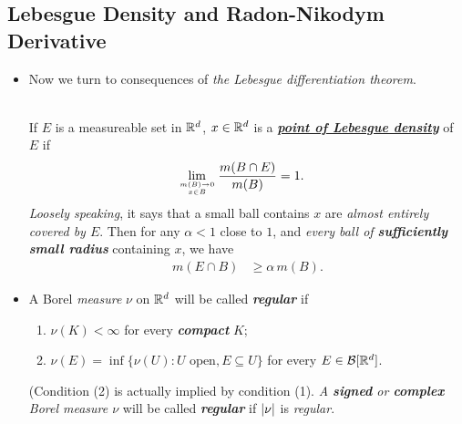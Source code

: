 \documentclass[11pt]{article}
\begin{document}
\subsection{Lebesgue Density and Radon-Nikodym Derivative}
\begin{itemize}
\item Now we turn to consequences of \emph{the Lebesgue differentiation theorem}. 
\begin{definition}\citep{stein2009real}\\
If $E$ is a measureable set in ${\mathbb R}^{d}$, $x\in {\mathbb R}^{d}$ is a \underline{\emph{\textbf{point of Lebesgue density}}} of $E$ if
\begin{align*}
\lim\limits_{m(B)\rightarrow 0 \atop x\in B}\frac{m(B\cap E)}{m(B)} &= 1.
\end{align*} 
\emph{Loosely speaking}, it says that a small ball contains $x$ are \emph{almost entirely covered by $E$}. Then for any $\alpha<1$ close to $1$, and \emph{every ball of \textbf{sufficiently small radius}} containing $x$, we have
\begin{align*}
m(E\cap B) &\ge \alpha\, m(B).
\end{align*}
\end{definition}

\item \begin{definition} 
A Borel \emph{measure} $\nu$ on ${\mathbb R}^d$ will be called \emph{\textbf{regular}} if
\begin{enumerate}
\item $\nu(K) < \infty$ for every \emph{\textbf{compact}} $K$;
\item $\nu(E) = \inf\{\nu(U): U\text{ open}, E \subseteq U\}$ for every $E \in {\mathcal B}[{\mathbb R}^{d}]$.
\end{enumerate}
(Condition (2) is actually implied by condition (1). \emph{A \textbf{signed} or \textbf{complex} Borel measure $\nu$} will be called \emph{\textbf{regular}} if $\left\lvert \nu \right\rvert$ is \emph{regular}.
\end{definition}


\end{itemize}
\end{document}
